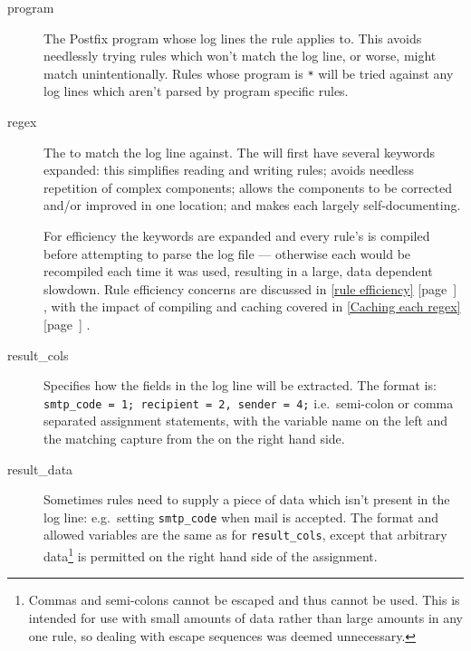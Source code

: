 \documentclass[]{svmult}
\newcommand{\refwithpage}[1]{%
    \empty{}\ref{#1} [page~\pageref{#1}]%
}
\newcommand{\sectionref}[1]{%
    \textsection{}\refwithpage{#1}%
}
\newcommand{\tab}[0]{%
    \hspace*{2em}%
}
\begin{document}
\begin{description}

    \item [program] The Postfix program whose log lines the rule applies
        to.  This avoids needlessly trying rules which won't match the log
        line, or worse, might match unintentionally.  Rules whose program
        is \texttt{*} will be tried against any log lines which aren't
        parsed by program specific rules.

    \item [regex] The \regex{} to match the log line against.  The \regex{}
        will first have several keywords expanded: this simplifies reading
        and writing rules; avoids needless repetition of complex \regex{}
        components; allows the components to be corrected and/or improved
        in one location; and makes each \regex{} largely self-documenting.

        For efficiency the keywords are expanded and every rule's \regex{}
        is compiled before attempting to parse the log file --- otherwise
        each \regex{} would be recompiled each time it was used, resulting
        in a large, data dependent slowdown.  Rule efficiency concerns are
        discussed in \sectionref{rule efficiency}, with the impact of
        compiling and caching \regexes{} covered in \sectionref{Caching
        each regex}.

    \item [result\_cols] Specifies how the fields in the
        log line will be extracted.  The format is:
        \newline \tab{} \texttt{smtp\_code = 1; recipient = 2, sender = 4;}
        \newline i.e.\ semi-colon or comma separated assignment statements,
        with the variable name on the left and the matching capture from
        the \regex{} on the right hand side.

    \item [result\_data] Sometimes rules need to supply a piece of data
        which isn't present in the log line: e.g.\ setting
        \texttt{smtp\_code} when mail is accepted.  The format and allowed
        variables are the same as for \texttt{result\_cols}, except that
        arbitrary data\footnote{Commas and semi-colons cannot be escaped
        and thus cannot be used.  This is intended for use with small
        amounts of data rather than large amounts in any one rule, so
        dealing with escape sequences was deemed unnecessary.} is permitted
        on the right hand side of the assignment.


\end{description}
\end{document}
